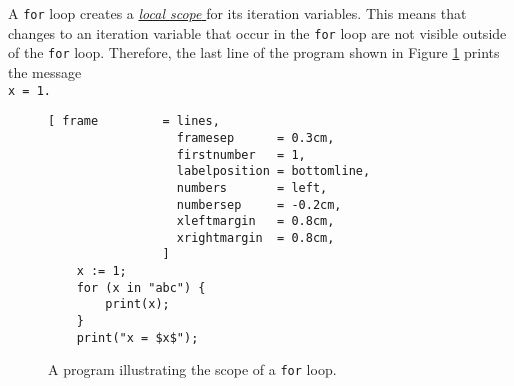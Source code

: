 A \texttt{for} loop creates a 
\href{http://en.wikipedia.org/wiki/Variable_scope}{\emph{local scope} }
for its iteration variables.  This means that changes to an iteration variable that occur in the
\texttt{for} loop are not visible outside of the \texttt{for} loop.
Therefore, the last line of the program shown in Figure \ref{fig:scope-for-loop.stlx} prints the
message 
\\[0.2cm]
\hspace*{1.3cm}
\texttt{x = 1.}

\begin{figure}[!ht]
\centering
\begin{Verbatim}[ frame         = lines, 
                  framesep      = 0.3cm, 
                  firstnumber   = 1,
                  labelposition = bottomline,
                  numbers       = left,
                  numbersep     = -0.2cm,
                  xleftmargin   = 0.8cm,
                  xrightmargin  = 0.8cm,
                ]
    x := 1;
    for (x in "abc") {
        print(x);
    }
    print("x = $x$");
\end{Verbatim}
\vspace*{-0.3cm}
\caption{A program illustrating the scope of a \texttt{for} loop.}
\label{fig:scope-for-loop.stlx}
\end{figure}




